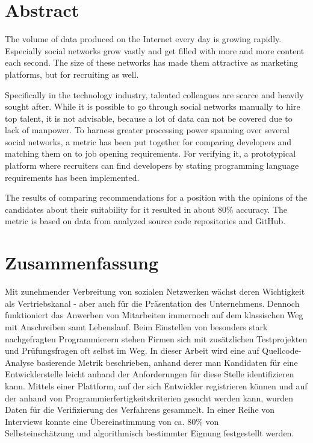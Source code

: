 \begingroup
\let\clearpage\relax
\let\cleardoublepage\relax
\let\cleardoublepage\relax

\chapter*{Abstract}
The volume of data produced on the Internet every day is growing rapidly. Especially social networks grow vastly and get filled with more and more content each second. The size of these networks has made them attractive as marketing platforms, but for recruiting as well.

Specifically in the technology industry, talented colleagues are scarce and heavily sought after. While it is possible to go through social networks manually to hire top talent, it is not advisable, because a lot of data can not be covered due to lack of manpower. To harness greater processing power spanning over several social networks, a metric has been put together for comparing developers and matching them on to job opening requirements. For verifying it, a prototypical platform where recruiters can find developers by stating programming language requirements has been implemented.

The results of comparing recommendations for a position with the opinions of the candidates about their suitability for it resulted in about 80\% accuracy. The metric is based on data from analyzed source code repositories and GitHub.


\vfill

\chapter*{Zusammenfassung}
Mit zunehmender Verbreitung von sozialen Netzwerken w\"achst deren Wichtigkeit als Vertriebskanal - aber auch f\"ur die Pr\"asentation des Unternehmens. Dennoch funktioniert das Anwerben von Mitarbeiten immernoch auf dem klassischen Weg mit Anschreiben samt Lebenslauf.
Beim Einstellen von besonders stark nachgefragten Programmierern stehen Firmen sich mit zus\"atzlichen Testprojekten und Pr\"ufungsfragen oft selbst im Weg. In dieser Arbeit wird eine auf Quellcode-Analyse basierende Metrik beschrieben, anhand derer man Kandidaten f\"ur eine Entwicklerstelle leicht anhand der Anforderungen f\"ur diese Stelle identifizieren kann. Mittels einer Plattform, auf der sich Entwickler registrieren k\"onnen und auf der anhand von Programmierfertigkeitskriterien gesucht werden kann, wurden Daten f\"ur die Verifizierung des Verfahrens gesammelt. In einer Reihe von Interviews konnte eine \"Ubereinstimmung von ca. 80\% von\\ Selbsteinsch\"atzung und algorithmisch bestimmter Eignung festgestellt werden.


\endgroup

\vfill